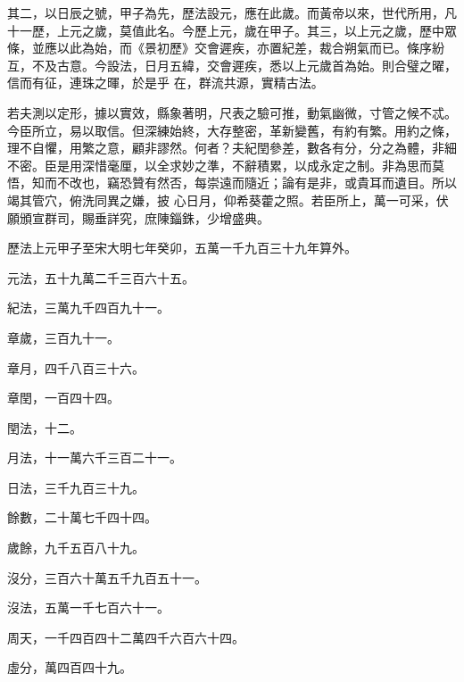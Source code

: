 \begin{pinyinscope}
 其二，以日辰之號，甲子為先，歷法設元，應在此歲。而黃帝以來，世代所用，凡十一歷，上元之歲，莫值此名。今歷上元，歲在甲子。其三，以上元之歲，歷中眾條，並應以此為始，而《景初歷》交會遲疾，亦置紀差，裁合朔氣而已。條序紛互，不及古意。今設法，日月五緯，交會遲疾，悉以上元歲首為始。則合璧之曜，信而有征，連珠之暉，於是乎
 在，群流共源，實精古法。



 若夫測以定形，據以實效，縣象著明，尺表之驗可推，動氣幽微，寸管之候不忒。今臣所立，易以取信。但深練始終，大存整密，革新變舊，有約有繁。用約之條，理不自懼，用繁之意，顧非謬然。何者？夫紀閏參差，數各有分，分之為體，非細不密。臣是用深惜毫厘，以全求妙之準，不辭積累，以成永定之制。非為思而莫悟，知而不改也，竊恐贊有然否，每崇遠而隨近；論有是非，或貴耳而遺目。所以竭其管穴，俯洗同異之嫌，披
 心日月，仰希葵藿之照。若臣所上，萬一可采，伏願頒宣群司，賜垂詳究，庶陳錙銖，少增盛典。



 歷法上元甲子至宋大明七年癸卯，五萬一千九百三十九年算外。



 元法，五十九萬二千三百六十五。



 紀法，三萬九千四百九十一。



 章歲，三百九十一。



 章月，四千八百三十六。



 章閏，一百四十四。



 閏法，十二。



 月法，十一萬六千三百二十一。



 日法，三千九百三十九。



 餘數，二十萬七千四十四。



 歲餘，九千五百八十九。



 沒分，三百六十萬五千九百五十一。



 沒法，五萬一千七百六十一。



 周天，一千四百四十二萬四千六百六十四。



 虛分，萬四百四十九。




\end{pinyinscope}
